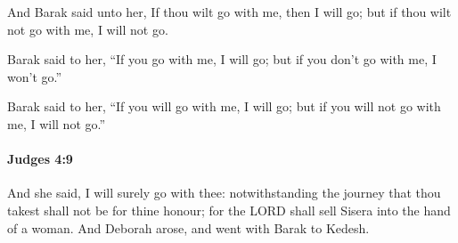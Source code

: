 			\begin{versebox}
					\item[BHS] 
					\item[ASV] And Barak said unto her, If thou wilt go with me, then I will go; but if thou wilt not go with me, I will not go.
					\item[NIV] Barak said to her, “If you go with me, I will go; but if you don’t go with me, I won’t go.”
					\item[NRSV] Barak said to her, “If you will go with me, I will go; but if you will not go with me, I will not go.”
			\end{versebox}

		\paragraph{Judges 4:9} %
			\label{JUDGES-4-9}

			And she said, I will surely go with thee: notwithstanding the journey that thou takest shall not be for thine honour; for the LORD shall sell Sisera into the hand of a woman. And Deborah arose, and went with Barak to Kedesh.


